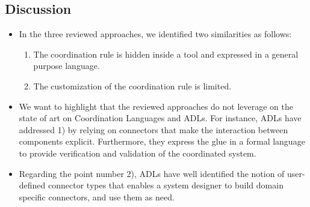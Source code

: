 \subsection{Discussion}
 	\begin{itemize}
		\item In the three reviewed approaches, we identified two similarities as follows:
		
		\begin{enumerate}
		\item The coordination rule is hidden inside a tool and expressed in a general purpose language.
		\item The customization of the coordination rule is limited.
		\end{enumerate}
		
		\item We want to highlight that the reviewed approaches do not leverage on the state of art on Coordination Languages and ADLs. For instance, ADLs have addressed 1) by relying on connectors that make the interaction between components explicit. Furthermore, they express the glue in a formal language to provide verification and validation of the coordinated system. 
		
		\item Regarding the point number 2), ADLs have well identified the notion of user-defined connector types that enables a system designer to build domain specific connectors, and use them as need.
	
	 	
 		 		
 		
 		

\end{itemize}
